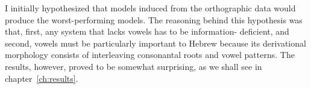 I initially hypothesized that models induced from the orthographic 
data would produce the worst-performing models. The reasoning behind this 
hypothesis was that, first, any system that lacks vowels has 
to be information- deficient, and second, vowels must be particularly important to 
Hebrew because its derivational morphology consists of interleaving consonantal 
roots and vowel patterns. The results, however, proved to be somewhat surprising, 
as we shall see in chapter~\ref{ch:results}.



